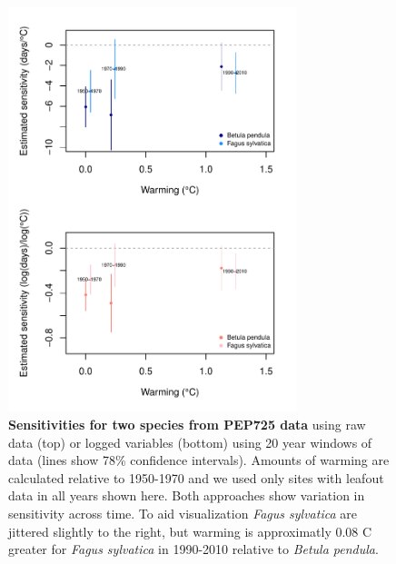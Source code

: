 \documentclass[11pt,letter]{article}
\begin{document}
\begin{figure}[h!]
\centering
\noindent \includegraphics[width=0.75\textwidth]{..//analyses/figures/basicpep1950to20002spp2panel.pdf}
\caption{\textbf{Sensitivities for two species from PEP725 data} using raw data (top) or logged variables (bottom) using 20 year windows of data (lines show 78\% confidence intervals). Amounts of warming are calculated relative to 1950-1970 and we used only sites with leafout data in all years shown here. Both approaches show variation in sensitivity across time. To aid visualization \emph{Fagus sylvatica} are jittered slightly to the right, but warming is approximatly 0.08 C greater for \emph{Fagus sylvatica} in 1990-2010 relative to \emph{Betula pendula}.}
\label{fig:pepper} %
\end{figure}
\end{document}
